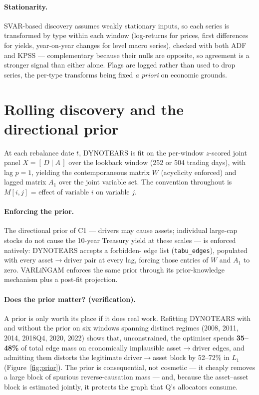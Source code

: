 \paragraph{Stationarity.} SVAR-based discovery assumes weakly stationary
inputs, so each series is transformed by type within each window (log-returns
for prices, first differences for yields, year-on-year changes for level
macro series), checked with both ADF and KPSS --- complementary because their
nulls are opposite, so agreement is a stronger signal than either alone.
Flags are logged rather than used to drop series, the per-type transforms
being fixed \emph{a priori} on economic grounds.

\section{Rolling discovery and the directional prior}
\label{sec:discovery-run}

At each rebalance date $t$, DYNOTEARS \cite{pamfil2020dynotears} is fit on the
per-window $z$-scored joint panel $X=[\,D \mid A\,]$ over the lookback window
(252 or 504 trading days), with lag $p=1$, yielding the contemporaneous matrix
$W$ (acyclicity enforced) and lagged matrix $A_1$ over the joint variable set.
The convention throughout is $M[i,j]$ = effect of variable $i$ on variable
$j$.

\paragraph{Enforcing the prior.} The directional prior of C1 --- drivers may
cause assets; individual large-cap stocks do not cause the 10-year Treasury
yield at these scales --- is enforced natively: DYNOTEARS accepts a forbidden-
edge list (\texttt{tabu\_edges}), populated with every asset$\to$driver pair
at every lag, forcing those entries of $W$ and $A_1$ to zero. VARLiNGAM
enforces the same prior through its prior-knowledge mechanism plus a post-fit
projection.

\paragraph{Does the prior matter? (verification).} A prior is only worth its
place if it does real work. Refitting DYNOTEARS with and without the prior on
six windows spanning distinct regimes (2008, 2011, 2014, 2018Q4, 2020, 2022)
shows that, unconstrained, the optimiser spends \textbf{35--48\%} of total
edge mass on economically implausible asset$\to$driver edges, and admitting
them distorts the legitimate driver$\to$asset block by 52--72\% in $L_1$
(Figure~\ref{fig:prior}). The prior is consequential, not cosmetic --- it
cheaply removes a large block of spurious reverse-causation mass --- and,
because the asset--asset block is estimated jointly, it protects the graph
that Q's allocators consume.

